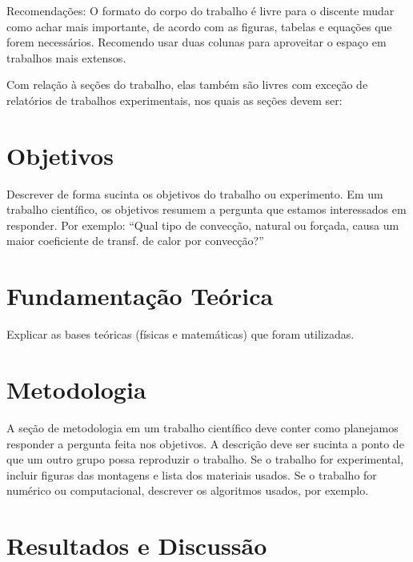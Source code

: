 \documentclass[a4paper,12pt]{article}
\begin{document}
    \begin{multicols}{2}
        Recomendações: O formato do corpo do trabalho é livre para o discente
        mudar como achar mais importante, de acordo com as figuras, tabelas e
        equações que forem necessários. Recomendo usar duas colunas para
        aproveitar o espaço em trabalhos mais extensos.

        Com relação à seções do trabalho, elas também são livres com exceção de
        relatórios de trabalhos experimentais, nos quais as seções devem ser:

        \section{Objetivos}

            Descrever de forma sucinta os objetivos do trabalho ou
            experimento. Em um trabalho científico, os objetivos resumem a
            pergunta que estamos interessados em responder. Por exemplo: “Qual
            tipo de convecção, natural ou forçada, causa um maior coeficiente
            de transf. de calor por convecção?”

        \section{Fundamentação Teórica}

            Explicar as bases teóricas (físicas e matemáticas) que foram
            utilizadas.
        
        \section{Metodologia}

            A seção de metodologia em um trabalho científico deve conter como
            planejamos responder a pergunta feita nos objetivos. A descrição
            deve ser sucinta a ponto de que um outro grupo possa reproduzir o
            trabalho. Se o trabalho for experimental, incluir figuras das
            montagens e lista dos materiais usados. Se o trabalho for numérico
            ou computacional, descrever os algoritmos usados, por exemplo.

        \section{Resultados e Discussão}


\end{multicols}
\end{document}
